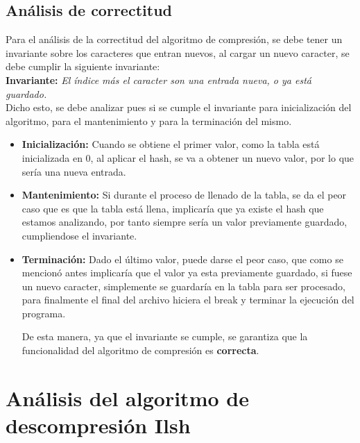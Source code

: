 \documentclass[letterpaper]{article}
\begin{document}
\subsection{Análisis de correctitud}

Para el análisis de la correctitud del algoritmo de compresión, se debe tener un invariante sobre los caracteres que entran nuevos, al cargar un nuevo caracter, se debe cumplir la siguiente invariante:\\

\textbf{Invariante:} \textit{El índice más el caracter son una entrada nueva, o ya está guardado.}\\

Dicho esto, se debe analizar pues si se cumple el invariante para inicialización del algoritmo, para el mantenimiento y para la terminación del mismo.\\

\begin{itemize}
\item \textbf{Inicialización:} Cuando se obtiene el primer valor, como la tabla está inicializada en 0, al aplicar el hash, se va a obtener un nuevo valor, por lo que sería una nueva entrada.

\item \textbf{Mantenimiento:} Si durante el proceso de llenado de la tabla, se da el peor caso que es que la tabla está llena, implicaría que ya existe el hash que estamos analizando, por tanto siempre sería un valor previamente guardado, cumpliendose el invariante.

\item \textbf{Terminación:} Dado el último valor, puede darse el peor caso, que como se mencionó antes implicaría que el valor ya esta previamente guardado, si fuese un nuevo caracter, simplemente se guardaría en la tabla para ser procesado, para finalmente el final del archivo hiciera el break y terminar la ejecución del programa.

De esta manera, ya que el invariante se cumple, se garantiza que la funcionalidad del algoritmo de compresión es \textbf{correcta}.\\


\end{itemize}



\section{Análisis del algoritmo de descompresión Ilsh}
\end{document}

